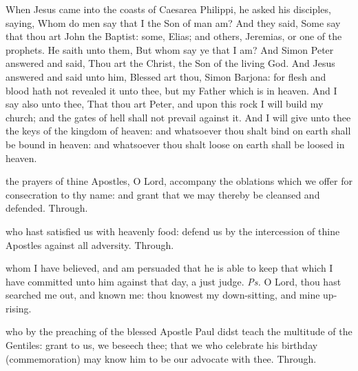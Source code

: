 
 When Jesus came into the coasts of Caesarea Philippi, he asked his disciples, saying, Whom do men say that I the Son of man am? And they said, Some say that thou art John the Baptist: some, Elias; and others, Jeremias, or one of the prophets. He saith unto them, But whom say ye that I am? And Simon Peter answered and said, Thou art the Christ, the Son of the living God. And Jesus answered and said unto him, Blessed art thou, Simon Barjona: for flesh and blood hath not revealed it unto thee, but my Father which is in heaven. And I say also unto thee, That thou art Peter, and upon this rock I will build my church; and the gates of hell shall not prevail against it. And I will give unto thee the keys of the kingdom of heaven: and whatsoever thou shalt bind on earth shall be bound in heaven: and whatsoever thou shalt loose on earth shall be loosed in heaven.


\secret
{} the prayers of thine Apostles, O Lord, accompany the oblations which we offer for consecration to thy name: and grant that we may thereby be cleansed and defended. Through.


\postcommunion
{} who hast satisfied us with heavenly food: defend us by the intercession of thine Apostles against all adversity. Through.



\clearpage
{}

\introit
{} whom I have believed, and am persuaded that he is able to keep that which I have committed unto him against that day, a just judge. \textit{Ps.} O Lord, thou hast searched me out, and known me: thou knowest my down-sitting, and mine up-rising.

\collect
{} who by the preaching of the blessed Apostle Paul didst teach the multitude of the Gentiles: grant to us, we beseech thee; that we who celebrate his birthday (commemoration) may know him to be our advocate with thee. Through.

